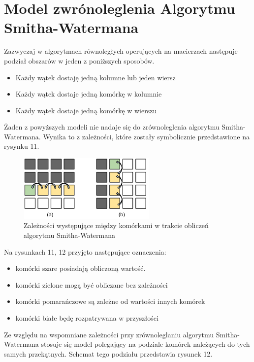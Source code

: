 \documentclass[a4paper,12pt]{article}
\newenvironment{lista}{
\begin{itemize}
  \setlength{\itemsep}{1pt}
  \setlength{\parskip}{0pt}
  \setlength{\parsep}{0pt}
}{\end{itemize}}
\begin{document}
\section*{Model zwrónoleglenia Algorytmu Smitha-Watermana}
Zazwyczaj w algorytmach równoległych operujących na macierzach następuje podział obszarów w jeden z poniższych sposobów. 
\begin{lista}
\item Każdy wątek dostaję jedną kolumne lub jeden wiersz
\item Każdy wątek dostaje jedną komórkę w kolumnie
\item Każdy wątek dostaje jedną komórkę w wierszu
\end{lista}

Żaden z powyższych modeli nie nadaje się do zrównoleglenia algorytmu Smitha-Watermana. Wynika to z zależności, które zostały symbolicznie przedstawione na rysynku 11.

\begin{figure}[H]
  \vspace{5pt}
  \centering
  \begin{center}
  \includegraphics[width=0.6\textwidth]{images/ZleModeleZrownoleglenia.png}
  \end{center}
  \caption{Zależności występujące między komórkami w trakcie obliczeń algorytmu Smitha-Watermana}
 \end{figure}


Na rysunkach 11, 12 przyjęto następujące oznaczenia: 
\begin{lista}
\item komórki szare posiadają obliczoną wartość.
\item komórki zielone mogą być obliczane bez zależności
\item komórki pomarańczowe są zależne od wartości innych komórek
\item komórki białe będę rozpatrywana w przyszłości
\end{lista} 

Ze względu na wspomniane zależności przy zrównoleglaniu algorytmu Smitha-Watermana stosuje się model polegający na podziale komórek należących do tych samych przekątnych. Schemat tego podziału przedstawia rysunek 12.
\end{document}
